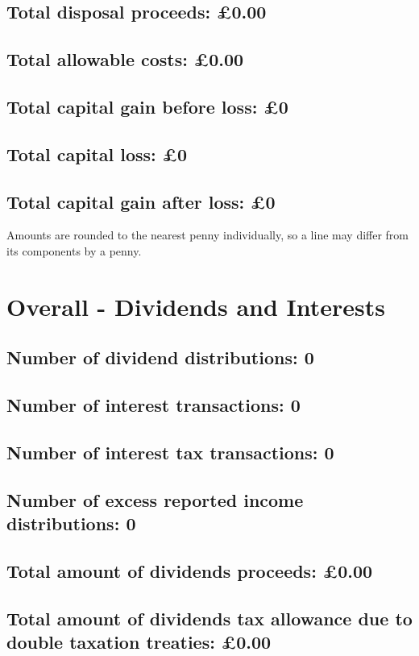 \documentclass{article}
\begin{document}
\subsection*{Total disposal proceeds: £0.00}
\subsection*{Total allowable costs: £0.00}
\subsection*{Total capital gain before loss: £0}
\subsection*{Total capital loss: £0}
\subsection*{Total capital gain after loss: £0}
\vspace{1em}
Amounts are rounded to the nearest penny individually, so a line may differ from its components by a penny.
\vspace{2em}
\section*{Overall - Dividends and Interests}
\subsection*{Number of dividend distributions: 0}
\subsection*{Number of interest transactions: 0}
\subsection*{Number of interest tax transactions: 0}
\subsection*{Number of excess reported income distributions: 0}
\subsection*{Total amount of dividends proceeds: £0.00}
\subsection*{Total amount of dividends tax allowance due to double taxation treaties: £0.00}
\end{document}
